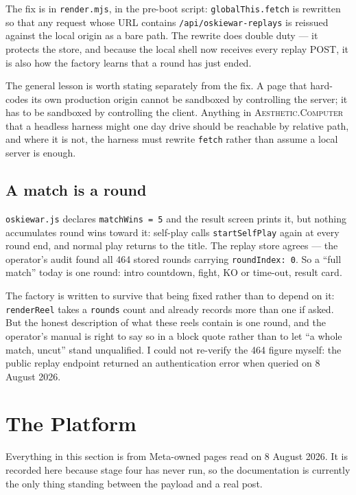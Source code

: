 \documentclass[10pt,letterpaper,twocolumn]{article}
\newcommand{\ac}{\textsc{Aesthetic.Computer}}
\newcommand{\code}[1]{\texttt{#1}}
\begin{document}
The fix is in \code{render.mjs}, in the pre-boot script: \code{globalThis.fetch}
is rewritten so that any request whose URL contains
\code{/api/oskiewar-replays} is reissued against the local origin as a bare
path. The rewrite does double duty --- it protects the store, and because the
local shell now receives every replay POST, it is also how the factory learns
that a round has just ended.

The general lesson is worth stating separately from the fix. A page that hard-codes
its own production origin cannot be sandboxed by controlling the server; it has
to be sandboxed by controlling the client. Anything in \ac{} that a headless
harness might one day drive should be reachable by relative path, and where it
is not, the harness must rewrite \code{fetch} rather than assume a local server
is enough.

\subsection{A match is a round}

\code{oskiewar.js} declares \code{matchWins = 5} and the result screen prints it,
but nothing accumulates round wins toward it: self-play calls
\code{startSelfPlay} again at every round end, and normal play returns to the
title. The replay store agrees --- the operator's audit found all 464 stored
rounds carrying \code{roundIndex: 0}. So a ``full match'' today is one round:
intro countdown, fight, KO or time-out, result card.

The factory is written to survive that being fixed rather than to depend on it:
\code{renderReel} takes a \code{rounds} count and already records more than one
if asked. But the honest description of what these reels contain is one round,
and the operator's manual is right to say so in a block quote rather than to let
``a whole match, uncut'' stand unqualified. I could not re-verify the 464 figure
myself: the public replay endpoint returned an authentication error when queried
on 8 August 2026.

\section{The Platform}
\label{sec:platform}

Everything in this section is from Meta-owned pages read on 8 August 2026. It is
recorded here because stage four has never run, so the documentation is
currently the only thing standing between the payload and a real post.
\end{document}
